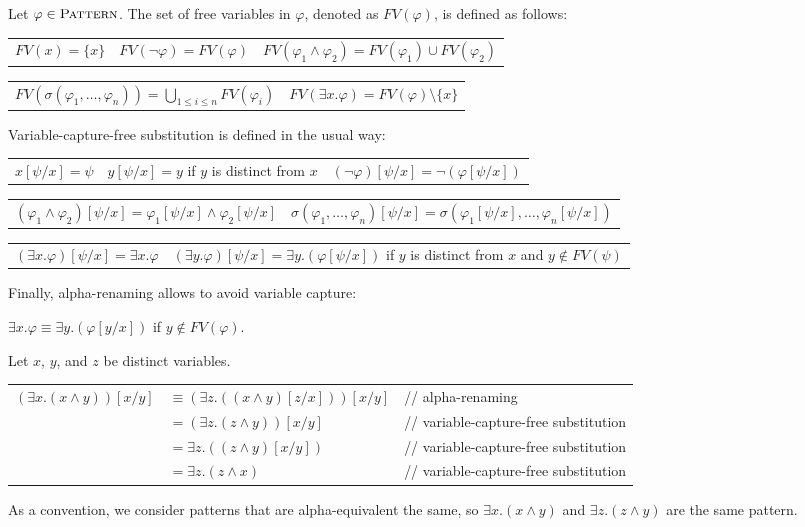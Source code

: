 \documentclass[acmsmall]{acmart}
\theoremstyle{acmdefinition}
\newcommand{\Pattern}{\textnormal{\textsc{Pattern}}}
\newcommand{\fv}{\mathit{FV}}
\newcommand{\FV}{\fv}
\newcommand{\ddd}{,\dots,}
\newcommand{\doubleslash}{//\xspace}
\begin{document}
\begin{definition}
\label{def_fv_etal}
Let $\varphi \in \Pattern$.
The set of free variables in $\varphi$, denoted as $\FV(\varphi)$,
is defined as follows:
\begin{center}
\begin{tabular}{ccc}
$\FV(x) = \{ x \}$ &
$\FV(\neg \varphi) = \FV(\varphi)$ &
$\FV(\varphi_1 \wedge \varphi_2) = \FV(\varphi_1) \cup \FV(\varphi_2)$
\end{tabular}
\begin{tabular}{cc}
$\FV(\sigma(\varphi_1 \ddd \varphi_n)) 
 = \bigcup_{1 \le i \le n} \FV(\varphi_i)$ &
$\FV(\exists x . \varphi) = \FV(\varphi) \setminus \{ x \}$
\end{tabular}
\end{center}
Variable-capture-free substitution is defined in the usual way:
\begin{center}
\begin{tabular}{ccc}
$x [ \psi / x ] = \psi$   &
$y [ \psi / x ] = y$ if $y$ is distinct from $x$ &
$(\neg \varphi)[\psi / x] = \neg (\varphi [\psi / x])$
\end{tabular}
\begin{tabular}{cc}
$(\varphi_1 \wedge \varphi_2) [\psi / x]
 = \varphi_1 [\psi / x] \wedge \varphi_2 [\psi / x]$ &
$\sigma(\varphi_1 \ddd \varphi_n)[\psi / x]
 = \sigma( \varphi_1[\psi/x] \ddd \varphi_n[\psi/x] )$
\end{tabular}
\begin{tabular}{cc}
$(\exists x . \varphi) [\psi / x] = \exists x . \varphi$ &
$(\exists y . \varphi) [\psi / x] = \exists y . (\varphi [\psi/x])$
if $y$ is distinct from $x$ and $y \not\in \FV(\psi)$
\end{tabular}
\end{center}
Finally, alpha-renaming allows to avoid variable capture:
\begin{center}
$\exists x . \varphi \equiv \exists y . (\varphi[y/x])$
\quad if $y \not\in \FV(\varphi)$.
\end{center}
\end{definition}

\begin{example}
\label{example_vcf_substitution}
Let $x$, $y$, and $z$ be distinct variables.
\begin{center}
\begin{tabular}{rll}
$(\exists x . (x \wedge y)) [x / y]$
& $\equiv (\exists z . ((x \wedge y) [z / x])) [x / y]$
& \doubleslash alpha-renaming
\\
& $= (\exists z . (z \wedge y)) [x / y]$
& \doubleslash variable-capture-free substitution
\\
& $= \exists z . ( (z \wedge y) [x / y] )$
& \doubleslash variable-capture-free substitution
\\
& $= \exists z . (z \wedge x)$
& \doubleslash variable-capture-free substitution
\end{tabular}
\end{center}
\end{example}
As a convention, we consider patterns that are alpha-equivalent the same,
so $\exists x . (x \wedge y)$ and $\exists z . (z \wedge y)$
are the same pattern.
\end{document}

